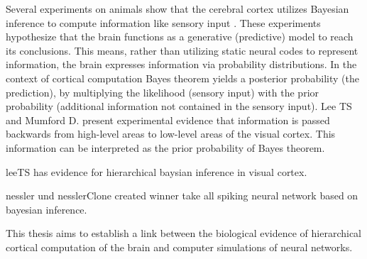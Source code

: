 Several experiments on animals show that the cerebral cortex utilizes Bayesian inference to compute information like sensory input \citep{neuralSubstrate, leeTS, anatomyOfInference}. These experiments hypothesize that the brain functions as a generative (predictive) model to reach its conclusions. This means, rather than utilizing static neural codes to represent information, the brain expresses information via probability distributions. In the context of cortical computation Bayes theorem yields a posterior probability (the prediction), by multiplying the likelihood (sensory input) with the prior probability (additional information not contained in the sensory input). Lee TS and Mumford D. present experimental evidence that information is passed backwards from high-level areas to low-level areas of the visual cortex. This information can be interpreted as the prior probability of Bayes theorem. 



leeTS has evidence for hierarchical baysian inference in visual cortex.

nessler und nesslerClone created winner take all spiking neural network based on bayesian inference. 


This thesis aims to establish a link between the biological evidence of hierarchical cortical computation of the brain and computer simulations of neural networks. 